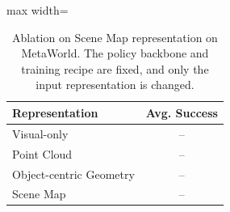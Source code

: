 \begin{table}[t]
\centering
\caption{Ablation on Scene Map representation on MetaWorld. The policy backbone and training recipe are fixed, and only the input representation is changed.}
\label{tab:ablation_representation}
\small
\setlength{\tabcolsep}{8pt}
\begin{adjustbox}{max width=\columnwidth}
\begin{tabular}{l|c}
\toprule
Representation & Avg. Success \\
\midrule
Visual-only & -- \\
Point Cloud & -- \\
Object-centric Geometry & -- \\
Scene Map & -- \\
\bottomrule
\end{tabular}
\end{adjustbox}
\end{table}
